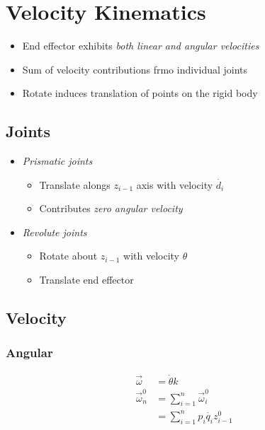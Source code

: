 \chapter{Velocity Kinematics}

\begin{itemize}
  \item End effector exhibits \emph{both linear and angular velocities}
  \item Sum of velocity contributions frmo individual joints
  \item Rotate induces translation of points on the rigid body
\end{itemize}

\section{Joints}

  \begin{itemize}
    \item \emph{Prismatic joints}
    \begin{itemize}
      \item Translate alongs $ z_{i - 1} $ axis with velocity $ \dot{d_{i}} $
      \item Contributes \emph{zero angular velocity}
    \end{itemize}

    \item \emph{Revolute joints}
    \begin{itemize}
      \item Rotate about $ z_{i - 1} $ with velocity $ \theta $
      \item Translate end effector
    \end{itemize}
  \end{itemize}

\section{Velocity}

  \subsection{Angular}

    \begin{align}
      \vec{\omega} &= \dot{\theta} k \\
      \vec{\omega}^{0}_{n}
        &= \sum_{i = 1}^{n} \vec{\omega}^{0}_{i} \\
        &= \sum_{i = 1}^{n} p_{i} \dot{q_{i}} z^{0}_{i - 1} \\
    \end{align}

